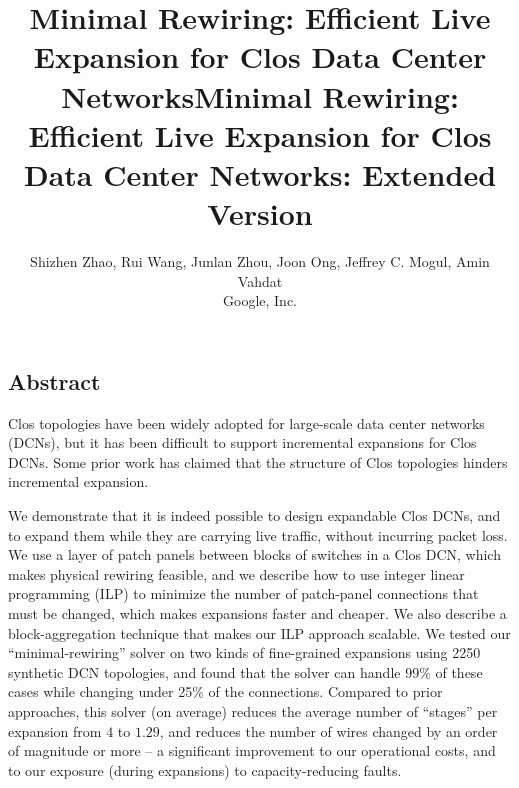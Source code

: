 \documentclass[letterpaper,twocolumn,10pt]{article}
\begin{document}
\date{}

\ifpaper
  \title{\Large \bf Minimal Rewiring: Efficient Live Expansion for Clos Data Center Networks}
\else
  \title{\Large \bf Minimal Rewiring: Efficient Live Expansion for Clos Data Center Networks: Extended Version}
\fi

\ifpaper
\fi

\author{
{\rm Shizhen Zhao, Rui Wang, Junlan Zhou, Joon Ong, Jeffrey C. Mogul, Amin Vahdat}\\
Google, Inc.
}

\maketitle

\thispagestyle{empty}

\subsection*{Abstract}
Clos topologies have been widely adopted for large-scale data center networks (DCNs), but it has been difficult to support incremental expansions for Clos DCNs.   Some prior work has claimed that the structure of Clos topologies hinders incremental expansion. 

We demonstrate that it is indeed possible to design expandable Clos DCNs, and to expand them while they are carrying live traffic, without incurring packet loss.  We use a layer of patch panels between blocks of switches in a Clos DCN, which makes physical rewiring feasible, and we describe how to use integer linear programming (ILP) to minimize the number of patch-panel connections that must be changed, which makes expansions faster and cheaper.  We also describe a block-aggregation technique that makes our ILP approach scalable. We tested our ``minimal-rewiring'' solver on two kinds of fine-grained expansions using 2250 synthetic DCN topologies, and found that the solver can handle 99\% of these cases while changing under 25\% of the connections.   Compared to prior approaches, this solver (on average) reduces the average number of  ``stages'' per expansion from $4$ to $1.29$, and reduces the number of wires changed by an order of magnitude or more -- a significant improvement to our operational costs, and to our exposure (during expansions) to capacity-reducing faults.
\end{document}
